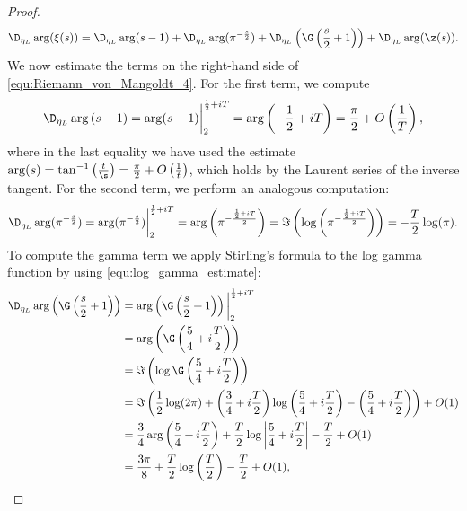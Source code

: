 \begin{proof}
        \begin{equation}\label{equ:Riemann_von_Mangoldt_4}
          \D_{\eta_{L}}\arg(\xi(s)) = \D_{\eta_{L}}\arg(s-1)+\D_{\eta_{L}}\arg(\pi^{-\frac{s}{2}})+\D_{\eta_{L}}\left(\G\left(\frac{s}{2}+1\right)\right)+\D_{\eta_{L}}\arg(\z(s)).
        \end{equation}
        We now estimate the terms on the right-hand side of \cref{equ:Riemann_von_Mangoldt_4}. For the first term, we compute
        \begin{equation}\label{equ:Riemann_von_Mangoldt_5}
          \D_{\eta_{L}}\arg\left(s-1\right) = \arg(s-1)\bigg|_{2}^{\frac{1}{2}+iT} = \arg\left(-\frac{1}{2}+iT\right) = \frac{\pi}{2}+O\left(\frac{1}{T}\right),
        \end{equation}
        where in the last equality we have used the estimate $\arg(s) = \tan^{-1}\left(\frac{t}{\s}\right) = \frac{\pi}{2}+O\left(\frac{1}{t}\right)$, which holds by the Laurent series of the inverse tangent. For the second term, we perform an analogous computation:
        \begin{equation}\label{equ:Riemann_von_Mangoldt_6}
          \D_{\eta_{L}}\arg(\pi^{-\frac{s}{2}}) = \arg(\pi^{-\frac{s}{2}})\bigg|_{2}^{\frac{1}{2}+iT} = \arg\left(\pi^{-\frac{\frac{1}{2}+iT}{2}}\right) = \Im\left(\log\left(\pi^{-\frac{\frac{1}{2}+iT}{2}}\right)\right) = -\frac{T}{2}\log(\pi).
        \end{equation}
        To compute the gamma term we apply Stirling's formula to the log gamma function by using \cref{equ:log_gamma_estimate}:
        \begin{equation}\label{equ:Riemann_von_Mangoldt_7}
          \begin{aligned}
            \D_{\eta_{L}}\arg\left(\G\left(\frac{s}{2}+1\right)\right) &= \arg\left(\G\left(\frac{s}{2}+1\right)\right)\bigg|_{2}^{\frac{1}{2}+iT} \\
            &= \arg\left(\G\left(\frac{5}{4}+i\frac{T}{2}\right)\right) \\
            &= \Im\left(\log\G\left(\frac{5}{4}+i\frac{T}{2}\right)\right) \\
            &= \Im\left(\frac{1}{2}\log(2\pi)+\left(\frac{3}{4}+i\frac{T}{2}\right)\log\left(\frac{5}{4}+i\frac{T}{2}\right)-\left(\frac{5}{4}+i\frac{T}{2}\right)\right)+O(1) \\
            &= \frac{3}{4}\arg\left(\frac{5}{4}+i\frac{T}{2}\right)+\frac{T}{2}\log\left|\frac{5}{4}+i\frac{T}{2}\right|-\frac{T}{2}+O(1) \\
            &= \frac{3\pi}{8}+\frac{T}{2}\log\left(\frac{T}{2}\right)-\frac{T}{2}+O(1),

\end{aligned}
\end{equation}
\end{proof}

